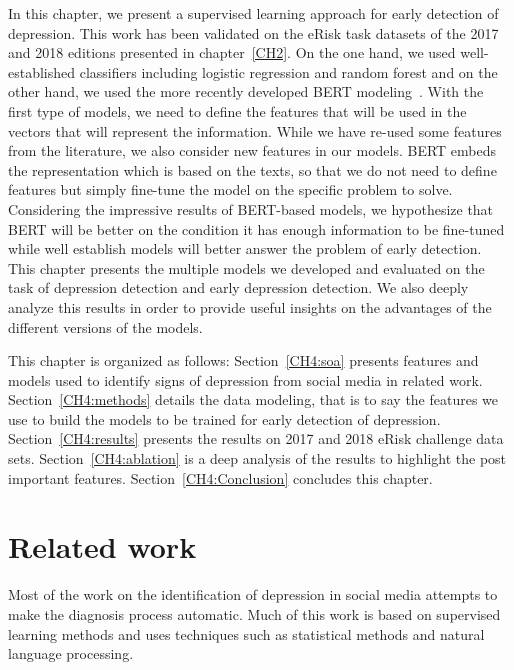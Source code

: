 \documentclass[graybox]{svmult}
\newcommand{\fr}[1]{\textcolor{brown}{#1}}
\newcommand{\jm}[1]{\textcolor{purple}{{  #1}}}
\begin{document}
In this chapter, we present a supervised learning approach for early detection of depression. This work has been validated on the eRisk task datasets of the 2017 and 2018 editions presented in chapter~\ref{CH2}.
On the one hand,  we used well-established classifiers including logistic regression and random forest and on the other hand, we used the more recently developed BERT modeling~\cite{}. 
With the first type of models, we need to define the features that will be used in the vectors that will represent the information.  While we have re-used some features from the literature, we also consider new features in our models. BERT embeds the representation which is based on the texts, so that we do not need to define features but simply fine-tune the model on the specific problem to solve. Considering the impressive results of BERT-based models, we hypothesize that BERT will be better on the condition it has enough information to be fine-tuned while well establish models will better answer the problem of early detection.  
This chapter presents the multiple models we developed and evaluated on the task of depression detection and early depression detection. We also deeply analyze this results in order to provide useful insights on the advantages of the different versions of the models.

This chapter  is organized as follows: Section~\ref{CH4:soa} presents  features and models used to identify signs of depression from social media in related work.%
Section~\ref{CH4:methods} details the data modeling, that is to say the features we use to build the models to be trained for early detection of depression. Section~\ref{CH4:results} presents the results on 2017 and 2018  eRisk challenge data sets. Section~\ref{CH4:ablation} is a deep analysis of the results to highlight the post important features. Section~\ref{CH4:Conclusion} concludes this chapter. 

\section{Related work}
Most of the work on the identification of depression in social media attempts to make the diagnosis process automatic. Much of this work is based on supervised learning methods and uses techniques such as statistical methods and natural language processing. 
\end{document}
